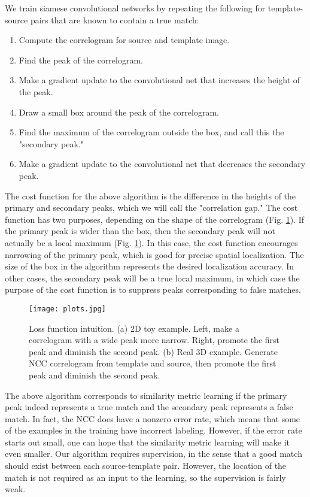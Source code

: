 \documentclass{article}
\begin{document}
We train siamese convolutional networks by repeating the following for template-source pairs that are known to contain a true match:
\begin{enumerate}
\item Compute the correlogram for source and template image. 
\item Find the peak of the correlogram. 
\item Make a gradient update to the convolutional net that increases the height of the peak. 
\item Draw a small box around the peak of the correlogram.
\item Find the maximum of the correlogram outside the box, and call this the "secondary peak."
\item Make a gradient update to the convolutional net that decreases the secondary peak.
\end{enumerate}
The cost function for the above algorithm is the difference in the heights of the primary and secondary peaks, which we will call the "correlation gap." The cost function has two purposes, depending on the shape of the correlogram (Fig. \ref{loss_function_2D}). If the primary peak is wider than the box, then the secondary peak will not actually be a local maximum (Fig. \ref{loss_function_2D}). In this case, the cost function encourages narrowing of the primary peak, which is good for precise spatial localization. The size of the box in the algorithm represents the desired localization accuracy. In other cases, the secondary peak will be a true local maximum, in which case the purpose of the cost function is to suppress peaks corresponding to false matches. 

\begin{figure}[h]
  \centering
  \texttt{[image: plots.jpg]}
  \caption{Loss function intuition. (a) 2D toy example. Left, make a correlogram with a wide peak more narrow. Right, promote the first peak and diminish the second peak. (b) Real 3D example. Generate NCC correlogram from template and source, then promote the first peak and diminish the second peak.}
  \label{loss_function_2D}
\end{figure}

The above algorithm corresponds to similarity metric learning if the primary peak indeed represents a true match and the secondary peak represents a false match. In fact, the NCC does have a nonzero error rate, which means that some of the examples in the training have incorrect labeling. However, if the error rate starts out small, one can hope that the similarity metric learning will make it even smaller. Our algorithm requires supervision, in the sense that a good match should exist between each source-template pair.  However, the location of the match is not required as an input to the learning, so the supervision is fairly weak.
\end{document}
